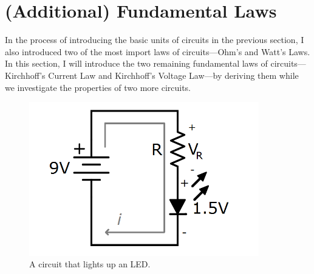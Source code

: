 \section{(Additional) Fundamental Laws}
In the process of introducing the basic units of circuits in the previous section, I also introduced two of the most import laws of circuits---Ohm's and Watt's Laws. In this section, I will introduce the two remaining fundamental laws of circuits---Kirchhoff's Current Law and Kirchhoff's Voltage Law---by deriving them while we investigate the properties of two more circuits.
\begin{figure}[h!]
\centering
\includegraphics[width=10cm]{figures/LEDCircuit.png}
\caption{A circuit that lights up an LED.}
\label{simpleLED}
\end{figure}

